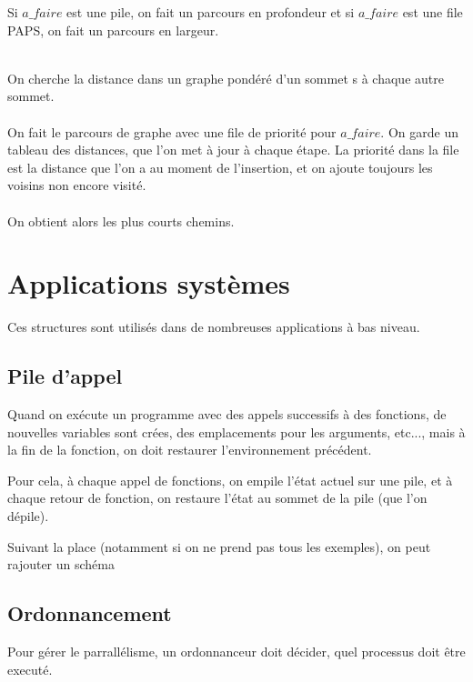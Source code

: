 Si $a\_faire$ est une pile, on fait un parcours en profondeur et si $a\_faire$ est une file PAPS, on fait un parcours en largeur.

\begin{algo}
	\enspace \\
	On cherche la distance dans un graphe pondéré d'un sommet s à chaque autre sommet.\\
	\\
	On fait le parcours de graphe avec une file de priorité pour $a\_faire$. On garde un tableau des distances, que l'on met à jour à chaque étape. La priorité dans la file est la distance que l'on a au moment de l'insertion, et on ajoute toujours les voisins non encore visité.\\
	\\
	On obtient alors les plus courts chemins.
\end{algo}

\section{Applications systèmes}

Ces structures sont utilisés dans de nombreuses applications à bas niveau.

\subsection{Pile d'appel}

Quand on exécute un programme avec des appels successifs à des fonctions, de nouvelles variables sont crées, des emplacements pour les arguments, etc..., mais à la fin de la fonction, on doit restaurer l'environnement précédent.

\begin{idee}
	Pour cela, à chaque appel de fonctions, on empile l'état actuel sur une pile, et à chaque retour de fonction, on restaure l'état au sommet de la pile (que l'on dépile).
\end{idee}

\begin{com}
	Suivant la place (notamment si on ne prend pas tous les exemples), on peut rajouter un schéma
\end{com}

\subsection{Ordonnancement}

    Pour gérer le parrallélisme, un ordonnanceur doit décider, quel processus doit être executé.

